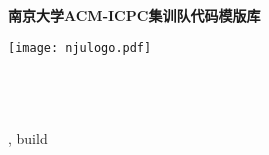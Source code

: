 \documentclass[9pt,landscape]{article}
\begin{document}
\vspace{3cm}
\thispagestyle{empty}
\null\vfill
\begin{center}
  \Huge \textbf{南京大学ACM-ICPC集训队代码模版库} \\
\vspace{1.5cm}

\texttt{[image: njulogo.pdf]}
\end{center}

\vspace{2cm}

\begin{minipage}{0.5\linewidth}
\platform \\ 
\xetexver \\
\pythonver \\
\buildtime, build \buildno
\end{minipage}
\vfill
\clearpage

\begin{multicols}{2}
\tableofcontents
\end{multicols}

\newpage


\begin{multicols}{2}

\end{multicols}
\end{document}

